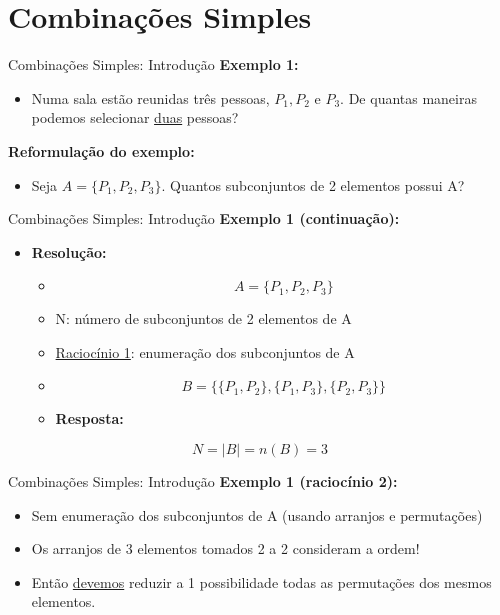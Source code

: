 \documentclass[aspectratio=169]{beamer}
\begin{document}
\section{Combinações Simples}

\begin{frame}{Combinações Simples: Introdução}
    \textbf{Exemplo 1:} 
    \begin{itemize}
        \item[] Numa sala estão reunidas três pessoas, $P_1, P_2$ e $P_3$. De quantas maneiras podemos selecionar \underline{duas} pessoas?
    \end{itemize}

    \pause
    \textbf{Reformulação do exemplo:} 
    
    \begin{itemize}
        \item[] Seja $A = \{P_1, P_2, P_3\}$. Quantos subconjuntos de 2 elementos possui A?
    \end{itemize}
    

\end{frame}

\begin{frame}{Combinações Simples: Introdução}
    \textbf{Exemplo 1 (continuação):} 

    \begin{itemize}
        \item[] \textbf{Resolução:}
        \begin{itemize}
            \item[] $$A = \{P_1, P_2, P_3\}$$ \vspace{2mm} \pause
            \item N: número de subconjuntos de 2 elementos de A
            \item \underline{Raciocínio 1}: enumeração dos subconjuntos de A
            \item[] $$B = \{\{P_1, P_2\}, \{P_1, P_3\}, \{P_2, P_3\}\}$$ \pause
            \item \textbf{Resposta:}
        \end{itemize}
    \end{itemize}

    $$ N = |B| = n(B) = 3$$
\end{frame}

\begin{frame}{Combinações Simples: Introdução}
    \textbf{Exemplo 1 (raciocínio 2):} 

    \begin{itemize}
        \item[] Sem enumeração dos subconjuntos de A (usando arranjos e permutações)
        \vspace{2mm}
        \item Os arranjos de 3 elementos tomados 2 a 2 consideram a ordem!
        \vspace{2mm}
        \item Então \underline{devemos} reduzir a 1 possibilidade todas as permutações dos mesmos elementos.
    \end{itemize}

\end{frame}
\end{document}
